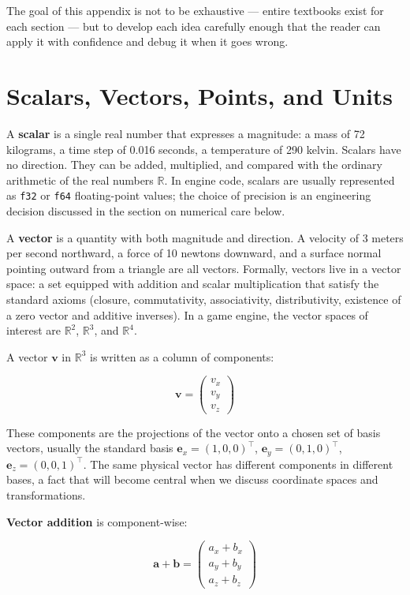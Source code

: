 \documentclass[
  11pt,
  letterpaper,
  DIV=11,
  numbers=noendperiod,
  twoside,
  open=right]{scrreprt}
\begin{document}
The goal of this appendix is not to be exhaustive --- entire textbooks
exist for each section --- but to develop each idea carefully enough
that the reader can apply it with confidence and debug it when it goes
wrong.

\section{Scalars, Vectors, Points, and
Units}\label{scalars-vectors-points-and-units}

A \textbf{scalar} is a single real number that expresses a magnitude: a
mass of 72 kilograms, a time step of 0.016 seconds, a temperature of 290
kelvin. Scalars have no direction. They can be added, multiplied, and
compared with the ordinary arithmetic of the real numbers
\(\mathbb{R}\). In engine code, scalars are usually represented as
\texttt{f32} or \texttt{f64} floating-point values; the choice of
precision is an engineering decision discussed in the section on
numerical care below.

A \textbf{vector} is a quantity with both magnitude and direction. A
velocity of 3 meters per second northward, a force of 10 newtons
downward, and a surface normal pointing outward from a triangle are all
vectors. Formally, vectors live in a vector space: a set equipped with
addition and scalar multiplication that satisfy the standard axioms
(closure, commutativity, associativity, distributivity, existence of a
zero vector and additive inverses). In a game engine, the vector spaces
of interest are \(\mathbb{R}^2\), \(\mathbb{R}^3\), and
\(\mathbb{R}^4\).

A vector \(\mathbf{v}\) in \(\mathbb{R}^3\) is written as a column of
components:

\[
\mathbf{v} = \begin{pmatrix} v_x \\ v_y \\ v_z \end{pmatrix}
\]

These components are the projections of the vector onto a chosen set of
basis vectors, usually the standard basis
\(\mathbf{e}_x = (1, 0, 0)^\top\), \(\mathbf{e}_y = (0, 1, 0)^\top\),
\(\mathbf{e}_z = (0, 0, 1)^\top\). The same physical vector has
different components in different bases, a fact that will become central
when we discuss coordinate spaces and transformations.

\textbf{Vector addition} is component-wise:

\[
\mathbf{a} + \mathbf{b} = \begin{pmatrix} a_x + b_x \\ a_y + b_y \\ a_z + b_z \end{pmatrix}
\]
\end{document}
